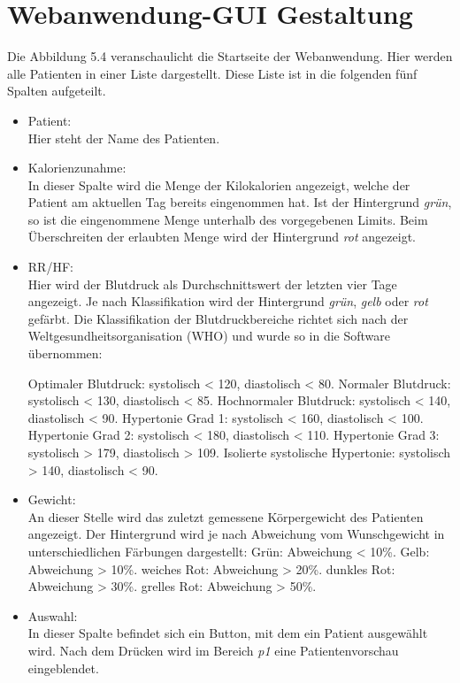 

\section{Webanwendung-GUI Gestaltung} 

Die Abbildung 5.4 veranschaulicht die Startseite der Webanwendung.
Hier werden alle Patienten in einer Liste dargestellt.
Diese Liste ist in die folgenden f\"unf Spalten aufgeteilt.

 \begin{itemize}
  \item Patient:\\
  Hier steht der Name des Patienten.
  
  \item Kalorienzunahme:\\
  In dieser Spalte wird die Menge der Kilokalorien angezeigt, 
  welche der Patient am aktuellen Tag bereits eingenommen hat.
  Ist der Hintergrund \emph{gr\"un}, so ist die eingenommene Menge unterhalb des 
  vorgegebenen Limits.
  Beim \"Uberschreiten der erlaubten Menge wird der Hintergrund \emph{rot} angezeigt.
  
  \item RR/HF:\\
  Hier wird der Blutdruck als Durchschnittswert der letzten vier Tage angezeigt.
  Je nach Klassifikation wird der Hintergrund \emph{gr\"un}, \emph{gelb} oder \emph{rot} 
  gef\"arbt. 
  Die Klassifikation der Blutdruckbereiche richtet sich nach der 
  Weltgesundheitsorganisation (WHO)\cite{WHO:01} und wurde so in die Software \"ubernommen:
  
  \subitem Optimaler Blutdruck: systolisch < 120, diastolisch < 80.
  \subitem Normaler Blutdruck: systolisch < 130, diastolisch < 85.
  \subitem Hochnormaler Blutdruck: systolisch < 140, diastolisch < 90.
  \subitem Hypertonie Grad 1: systolisch < 160, diastolisch < 100.
  \subitem Hypertonie Grad 2: systolisch < 180, diastolisch < 110.
  \subitem Hypertonie Grad 3: systolisch > 179, diastolisch > 109.
  \subitem Isolierte systolische Hypertonie: systolisch > 140, diastolisch < 90.
  
  \item Gewicht:\\
  An dieser Stelle wird das zuletzt gemessene K\"orpergewicht des Patienten angezeigt.
  Der Hintergrund wird je nach Abweichung vom Wunschgewicht in unterschiedlichen 
  F\"arbungen dargestellt:
  \subitem Gr\"un: Abweichung < 10\%.
  \subitem Gelb: Abweichung > 10\%.
  \subitem weiches Rot: Abweichung > 20\%.
  \subitem dunkles Rot: Abweichung > 30\%.
  \subitem grelles Rot: Abweichung > 50\%.
  
  \item Auswahl:\\
  In dieser Spalte befindet sich ein Button, mit dem ein Patient ausgew\"ahlt wird.
  Nach dem Dr\"ucken wird im Bereich \emph{p1} eine Patientenvorschau eingeblendet.
 \end{itemize}

